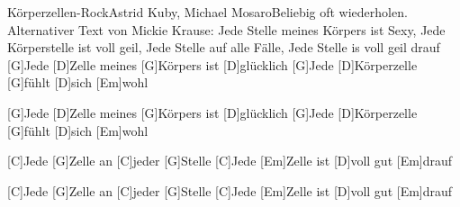 \documentclass[../main.tex]{subfiles}
\begin{document}
\begin{song}[5]{Körperzellen-Rock}{Astrid Kuby, Michael Mosaro}{Beliebig oft wiederholen.\\Alternativer Text von Mickie Krause: Jede Stelle meines Körpers ist Sexy, Jede Körperstelle ist voll geil, Jede Stelle auf alle Fälle, Jede Stelle is voll geil drauf}
[G]Jede [D]Zelle meines [G]Körpers ist [D]glücklich
[G]Jede [D]Körperzelle [G]fühlt [D]sich [Em]wohl

[G]Jede [D]Zelle meines [G]Körpers ist [D]glücklich
[G]Jede [D]Körperzelle [G]fühlt [D]sich [Em]wohl

[C]Jede [G]Zelle an [C]jeder [G]Stelle
[C]Jede [Em]Zelle ist [D]voll gut [Em]drauf

[C]Jede [G]Zelle an [C]jeder [G]Stelle
[C]Jede [Em]Zelle ist [D]voll gut [Em]drauf
\end{song}
\end{document}
